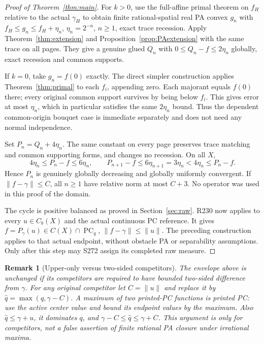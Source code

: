 \documentclass[11pt]{article}
\newtheorem{remark}[theorem]{Remark}
\newcommand{\PC}{\operatorname{PC}_q}
\begin{document}
\begin{proof}[Proof of Theorem~\ref{thm:main}]
For $k>0$, use the full-affine primal theorem on $f_H$ relative to the actual $\gamma_H$ to obtain finite rational-spatial real PA convex $g_n$ with $f_H\leq g_n\leq f_H+\eta_n$, $\eta_n=2^{-n}$, $n\geq1$, exact trace recession. Apply Theorem~\ref{thm:extension} and Proposition~\ref{prop:PAextension} with the same trace on all pages. They give a genuine glued $Q_n$ with $0\leq Q_n-f\leq2\eta_n$ globally, exact recession and common supports.

If $k=0$, take $g_n=f(0)$ exactly. The direct simpler construction applies Theorem~\ref{thm:primal} to each $f_i$, appending zero. Each majorant equals $f(0)$ there; every original common support survives by being below $f_i$. This gives error at most $\eta_n$, which in particular satisfies the same $2\eta_n$ bound. Thus the dependent common-origin bouquet case is immediate separately and does not need any normal independence.

Set $P_n=Q_n+4\eta_n$. The same constant on every page preserves trace matching and common supporting forms, and changes no recession. On all $X$,
\[
 4\eta_n\leq P_n-f\leq6\eta_n,\qquad
 P_{n+1}-f\leq6\eta_{n+1}=3\eta_n<4\eta_n\leq P_n-f.
\]
Hence $P_n$ is genuinely globally decreasing and globally uniformly convergent. If $\|f-\gamma\|\leq C$, all $n\geq1$ have relative norm at most $C+3$. No operator was used in this proof of the domain.

The cycle is positive balanced as proved in Section~\ref{sec:raw}. R230 now applies to every $u\in C_b(X)$ and the actual continuous PC reference. It gives $f=P_\gamma(u)\in C(X)\cap\PC$, $\|f-\gamma\|\leq\|u\|$. The preceding construction applies to that actual endpoint, without obstacle PA or separability assumptions. Only after this step may S272 assign its completed raw measure.
\end{proof}

\begin{remark}[Upper-only versus two-sided competitors]
The envelope above is unchanged if its competitors are required to have bounded two-sided difference from $\gamma$. For any original competitor let $C=\|u\|$ and replace it by $\widehat q=\max(q,\gamma-C)$. A maximum of two printed-PC functions is printed PC: use the active center value and bound its endpoint values by the maximum. Also $\widehat q\leq\gamma+u$, it dominates $q$, and $\gamma-C\leq\widehat q\leq\gamma+C$. This argument is only for competitors, not a false assertion of finite rational PA closure under irrational maxima.
\end{remark}
\end{document}

